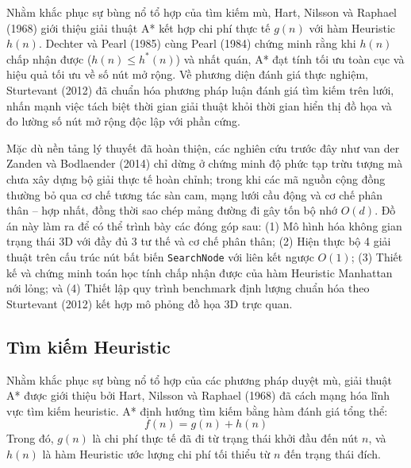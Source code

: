 Nhằm khắc phục sự bùng nổ tổ hợp của tìm kiếm mù, Hart, Nilsson và
Raphael (1968) \cite{hart1968astar} giới thiệu giải thuật A* kết hợp
chi phí thực tế $g(n)$ với hàm Heuristic $h(n)$. Dechter và Pearl (1985)
\cite{dechter1985astar} cùng Pearl (1984) \cite{pearl1984heuristics}
chứng minh rằng khi $h(n)$ chấp nhận được ($h(n) \le h^*(n)$) và nhất
quán, A* đạt tính tối ưu toàn cục và hiệu quả tối ưu về số nút mở rộng.
Về phương diện đánh giá thực nghiệm, Sturtevant (2012)
\cite{sturtevant2012benchmarks} đã chuẩn hóa phương pháp luận đánh giá
tìm kiếm trên lưới, nhấn mạnh việc tách biệt thời gian giải thuật khỏi
thời gian hiển thị đồ họa và đo lường số nút mở rộng độc lập với phần cứng.

Mặc dù nền tảng lý thuyết đã hoàn thiện, các nghiên cứu trước đây như
van der Zanden và Bodlaender (2014) \cite{vanderzanden2014bloxorz} chỉ
dừng ở chứng minh độ phức tạp trừu tượng mà chưa xây dựng bộ giải thực
tế hoàn chỉnh; trong khi các mã nguồn cộng đồng thường bỏ qua cơ chế
tương tác sàn cam, mạng lưới cầu động và cơ chế phân thân -- hợp nhất,
đồng thời sao chép mảng đường đi gây tốn bộ nhớ $O(d)$. Đồ án này
làm ra để có thể trình bày các đóng góp sau: (1) Mô hình hóa không
gian trạng thái 3D với đầy đủ 3 tư thế và cơ chế phân thân; (2) Hiện
thực bộ 4 giải thuật trên cấu trúc nút bất biến \texttt{SearchNode} với
liên kết ngược $O(1)$; (3) Thiết kế và chứng minh toán học tính chấp
nhận được của hàm Heuristic Manhattan nới lỏng; và (4) Thiết lập quy
trình benchmark định lượng chuẩn hóa theo Sturtevant (2012) kết hợp mô
phỏng đồ họa 3D trực quan.

\subsection{Tìm kiếm Heuristic}
\label{subsec:related_heuristics}
Nhằm khắc phục sự bùng nổ tổ hợp của các phương pháp duyệt mù, giải thuật
A* được giới thiệu bởi Hart, Nilsson và Raphael (1968) \cite{hart1968astar}
đã cách mạng hóa lĩnh vực tìm kiếm heuristic. A* định hướng tìm kiếm bằng
hàm đánh giá tổng thể:
\begin{equation}
    f(n) = g(n) + h(n)
    \label{eq:astar_eval}
\end{equation}
Trong đó, $g(n)$ là chi phí thực tế đã đi từ trạng thái khởi đầu đến nút
$n$, và $h(n)$ là hàm Heuristic ước lượng chi phí tối thiểu từ $n$ đến
trạng thái đích.

